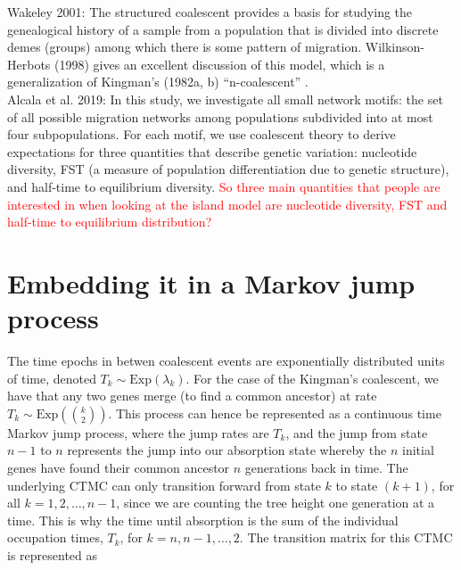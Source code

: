 \documentclass[12pt,a4paper]{article}
\begin{document}
Wakeley 2001: The structured coalescent provides a basis for studying the genealogical history of a sample from a population that is divided into discrete demes (groups) among which there is some pattern of migration. Wilkinson-Herbots (1998) gives an excellent discussion of this model, which is a generalization of Kingman's (1982a, b) ``n-coalescent'' \citep{wakeley2001coalescent}. \\

 Alcala et al. 2019: In this study, we investigate all small network motifs: the set of all possible migration networks among populations subdivided into at most four subpopulations. For each motif, we use coalescent theory to derive expectations for three quantities that describe genetic variation: nucleotide diversity, FST (a measure of population differentiation due to genetic structure), and half-time to equilibrium diversity. \textcolor{red}{So three main quantities that people are interested in when looking at the island model are nucleotide diversity, FST and half-time to equilibrium distribution?}

 \section{Embedding it in a Markov jump process}
The time epochs in betwen coalescent events are exponentially distributed units of time, denoted $T_k \sim \mbox{Exp}(\lambda_k)$. For the case of the Kingman's coalescent, we have that any two genes merge (to find a common ancestor) at rate $T_k \sim \mbox{Exp}(\binom{k}{2})$. This process can hence be represented as a continuous time Markov jump process, where the jump rates are $T_k$, and the jump from state $n-1$ to $n$ represents the jump into our absorption state whereby the $n$ initial genes have found their common ancestor $n$ generations back in time. The underlying CTMC can only transition forward from state $k$ to state $(k+1)$, for all $k = 1,2,\ldots,n-1$, since we are counting the tree height one generation at a time. This is why the time until absorption is the sum of the individual occupation times, $T_k$, for $k=n,n-1,\ldots,2$. The transition matrix for this CTMC is represented as 
\end{document}
